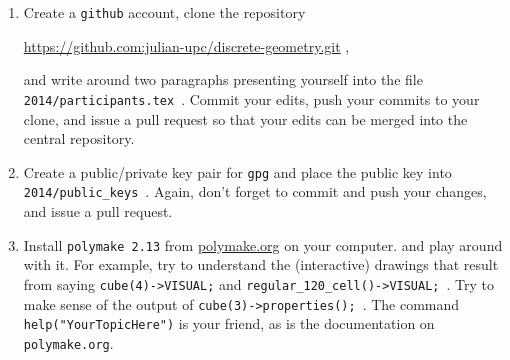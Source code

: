 \documentclass[11pt]{amsart}
\begin{document}
\begin{enumerate}
\setlength{\itemsep}{2ex}
\item Create a \texttt{github} account, clone the repository
  \begin{center}
    \url{https://github.com:julian-upc/discrete-geometry.git} ,
  \end{center}
  and write around two paragraphs presenting yourself into the file
  \texttt{2014/participants.tex}~. Commit your edits, push your
  commits to your clone, and issue a pull request so that your edits
  can be merged into the central repository.

\item Create a public/private key pair for \texttt{gpg} and place the
  public key into \texttt{2014/public\_keys}~. Again, don't forget to
  commit and push your changes, and issue a pull request.

\item Install \texttt{polymake 2.13} from \url{polymake.org} on your
  computer. and play around with it. For example, try to understand
  the (interactive) drawings that result from saying
  \texttt{cube(4)->VISUAL;} and
  \texttt{regular\_120\_cell()->VISUAL;}~. Try to make sense of the
  output of \texttt{cube(3)->properties();}~. The command
  \texttt{help("YourTopicHere")} is your friend, as is the
  documentation on \texttt{polymake.org}.
\end{enumerate}
\end{document}
